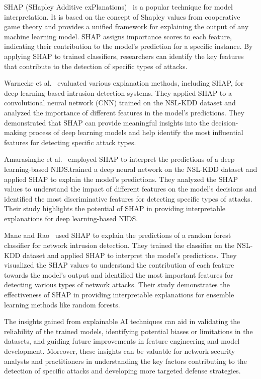 SHAP (SHapley Additive exPlanations)~\cite{lundberg2017unified} is a popular technique for model interpretation. It is based on the concept of Shapley values from cooperative game theory and provides a unified framework for explaining the output of any machine learning model. SHAP assigns importance scores to each feature, indicating their contribution to the model's prediction for a specific instance. By applying SHAP to trained classifiers, researchers can identify the key features that contribute to the detection of specific types of attacks.

Warnecke et al.~\cite{warnecke2020evaluating} evaluated various explanation methods, including SHAP, for deep learning-based intrusion detection systems. They applied SHAP to a convolutional neural network (CNN) trained on the NSL-KDD dataset and analyzed the importance of different features in the model's predictions. They demonstrated that SHAP can provide meaningful insights into the decision-making process of deep learning models and help identify the most influential features for detecting specific attack types.

Amarasinghe et al.~\cite{amarasinghe2018toward} employed SHAP to interpret the predictions of a deep learning-based NIDS.\@They trained a deep neural network on the NSL-KDD dataset and applied SHAP to explain the model's predictions. They analyzed the SHAP values to understand the impact of different features on the model's decisions and identified the most discriminative features for detecting specific types of attacks. Their study highlights the potential of SHAP in providing interpretable explanations for deep learning-based NIDS.\@

Mane and Rao~\cite{mane2021explaining} used SHAP to explain the predictions of a random forest classifier for network intrusion detection. They trained the classifier on the NSL-KDD dataset and applied SHAP to interpret the model's predictions. They visualized the SHAP values to understand the contribution of each feature towards the model's output and identified the most important features for detecting various types of network attacks. Their study demonstrates the effectiveness of SHAP in providing interpretable explanations for ensemble learning methods like random forests.

The insights gained from explainable AI techniques can aid in validating the reliability of the trained models, identifying potential biases or limitations in the datasets, and guiding future improvements in feature engineering and model development. Moreover, these insights can be valuable for network security analysts and practitioners in understanding the key factors contributing to the detection of specific attacks and developing more targeted defense strategies.